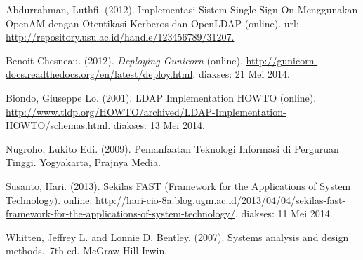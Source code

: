 %
% 

% 
% 
\begin{thebibliography}{4}

{Abdurrahman, Luthfi. (2012). 
\f{Implementasi Sistem Single Sign-On Menggunakan OpenAM dengan Otentikasi Kerberos dan OpenLDAP} (online).
url: \url{http://repository.usu.ac.id/handle/123456789/31207.}}

{Benoit Chesneau. (2012).
\textit{Deploying Gunicorn} (online).
\url{http://gunicorn-docs.readthedocs.org/en/latest/deploy.html}.
diakses: 21 Mei 2014.}

{Biondo, Giuseppe Lo. (2001). 
\f{LDAP Implementation HOWTO} (online).
\url{http://www.tldp.org/HOWTO/archived/LDAP-Implementation-HOWTO/schemas.html}.
diakses: 13 Mei 2014.}

{Nugroho, Lukito Edi. (2009). 
\f{Pemanfaatan Teknologi Informasi di Perguruan Tinggi}.
Yogyakarta, Prajnya Media.}

{Susanto, Hari. (2013). \f{Sekilas FAST (Framework for the Applications of System Technology)}. online: \url{http://hari-cio-8a.blog.ugm.ac.id/2013/04/04/sekilas-fast-framework-for-the-applications-of-system-technology/}, diakses: 11 Mei 2014.}

{Whitten, Jeffrey L. and Lonnie D. Bentley. (2007).
\f{Systems analysis and design methods.--7th ed.} McGraw-Hill Irwin.}

\end{thebibliography}

